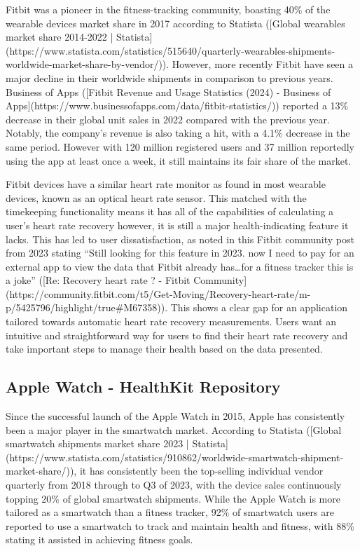 \documentclass{l4proj}
\begin{document}
Fitbit was a pioneer in the fitness-tracking community, boasting 40\% of the wearable devices market share in 2017 according to Statista ([Global wearables market share 2014-2022 | Statista](https://www.statista.com/statistics/515640/quarterly-wearables-shipments-worldwide-market-share-by-vendor/)). However, more recently Fitbit have seen a major decline in their worldwide shipments in comparison to previous years. Business of Apps ([Fitbit Revenue and Usage Statistics (2024) - Business of Apps](https://www.businessofapps.com/data/fitbit-statistics/)) reported a 13\% decrease in their global unit sales in 2022 compared with the previous year. Notably, the company’s revenue is also taking a hit, with a 4.1\% decrease in the same period. However with 120 million registered users and 37 million reportedly using the app at least once a week, it still maintains its fair share of the market.

Fitbit devices have a similar heart rate monitor as found in most wearable devices, known as an optical heart rate sensor. This matched with the timekeeping functionality means it has all of the capabilities of calculating a user’s heart rate recovery however, it is still a major health-indicating feature it lacks. This has led to user dissatisfaction, as noted in this Fitbit community post from 2023 stating “Still looking for this feature in 2023. now I need to pay for an external app to view the data that Fitbit already has…for a fitness tracker this is a joke” ([Re: Recovery heart rate ? - Fitbit Community](https://community.fitbit.com/t5/Get-Moving/Recovery-heart-rate/m-p/5425796/highlight/true#M67358)). This shows a clear gap for an application tailored towards automatic heart rate recovery measurements. Users want an intuitive and straightforward way for users to find their heart rate recovery and take important steps to manage their health based on the data presented.

\subsection{Apple Watch - HealthKit Repository}

Since the successful launch of the Apple Watch in 2015, Apple has consistently been a major player in the smartwatch market. According to Statista ([Global smartwatch shipments market share 2023 | Statista](https://www.statista.com/statistics/910862/worldwide-smartwatch-shipment-market-share/)), it has consistently been the top-selling individual vendor quarterly from 2018 through to Q3 of 2023, with the device sales continuously topping 20\% of global smartwatch shipments. While the Apple Watch is more tailored as a smartwatch than a fitness tracker, 92\% of smartwatch users are reported to use a smartwatch to track and maintain health and fitness, with 88\% stating it assisted in achieving fitness goals.
\end{document}
